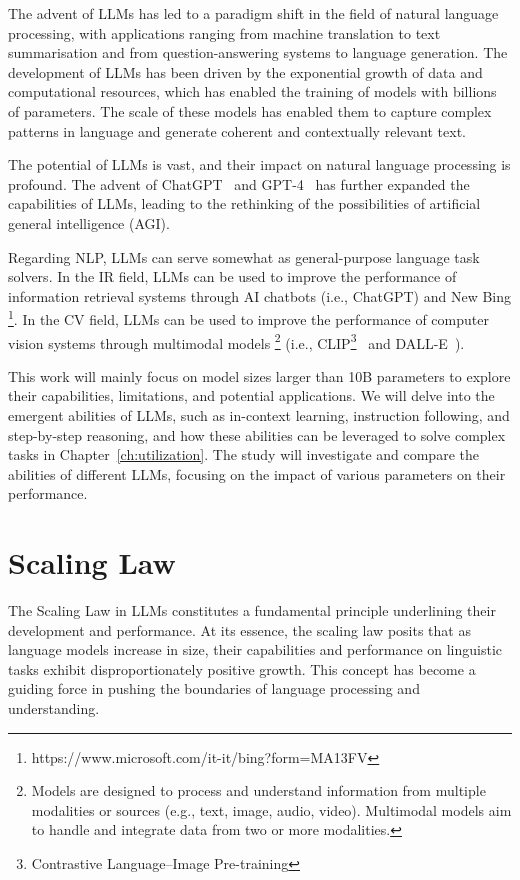 The advent of LLMs has led to a paradigm shift in the field of natural language processing, with applications ranging from machine translation to text summarisation and from question-answering systems to language generation.
The development of LLMs has been driven by the exponential growth of data and computational resources, which has enabled the training of models with billions of parameters.
The scale of these models has enabled them to capture complex patterns in language and generate coherent and contextually relevant text.

The potential of LLMs is vast, and their impact on natural language processing is profound.
The advent of ChatGPT~\cite{adiwardana2020towards} and GPT-4~\cite{openai2024gpt4} has further expanded the capabilities of LLMs, leading to the rethinking of the possibilities of artificial general intelligence (AGI).

Regarding NLP, LLMs can serve somewhat as general-purpose language task solvers.
In the IR field, LLMs can be used to improve the performance of information retrieval systems through AI chatbots (i.e., ChatGPT) and New Bing \footnote{https://www.microsoft.com/it-it/bing?form=MA13FV}.
In the CV field, LLMs can be used to improve the performance of computer vision systems through multimodal models \footnote{
	Models are designed to process and understand information from multiple modalities or sources (e.g., text, image, audio, video).
	Multimodal models aim to handle and integrate data from two or more modalities.
} (i.e., CLIP\footnote{Contrastive Language–Image Pre-training}~\cite{radford2021learning} and DALL-E~\cite{ramesh2021zero}).

This work will mainly focus on model sizes larger than 10B parameters to explore their capabilities, limitations, and potential applications.
We will delve into the emergent abilities of LLMs, such as in-context learning, instruction following, and step-by-step reasoning, and how these abilities can be leveraged to solve complex tasks in Chapter~\ref{ch:utilization}.
The study will investigate and compare the abilities of different LLMs, focusing on the impact of various parameters on their performance.


\section{Scaling Law}
\label{sec:scaling-law-in-large-language-models}

The Scaling Law in LLMs constitutes a fundamental principle underlining their development and performance.
At its essence, the scaling law posits that as language models increase in size, their capabilities and performance on linguistic tasks exhibit disproportionately positive growth.
This concept has become a guiding force in pushing the boundaries of language processing and understanding.

